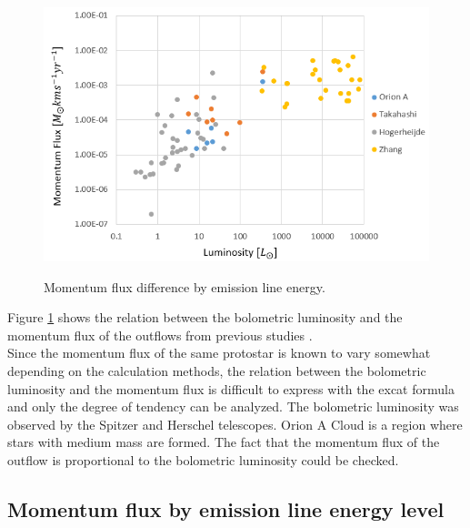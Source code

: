 \begin{figure}[h!]
	\centering
	\includegraphics[width=\textwidth]{Luminosity}
	\label{lum}
	\caption{Momentum flux difference by emission line energy.}
\end{figure}


Figure \ref{lum} shows the relation between the bolometric luminosity and the momentum flux of the outflows from previous studies \cite{takahashi2008millimeter, van2013outflow, hogerheijde1998envelope, nakamura2012evidence, aso2000dense, zhang2005search}. \\ Since the momentum flux of the same protostar is known to vary somewhat depending on the calculation methods\cite{van2013outflow}, the relation between the bolometric luminosity and the momentum flux is difficult to express with the excat formula and only the degree of tendency can be analyzed.
The bolometric luminosity was observed by the Spitzer and Herschel telescopes. Orion A Cloud is a region where stars with medium mass are formed. The fact that the momentum flux of the outflow is proportional to the bolometric luminosity could be checked.

\newpage

\subsection{Momentum flux by emission line energy level}

